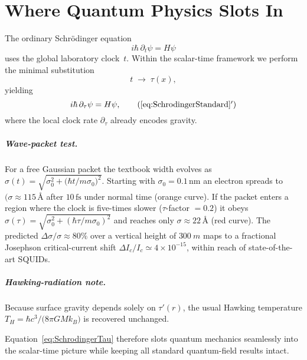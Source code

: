 \chapter{Where Quantum Physics Slots In}

The ordinary Schrödinger equation
\[
  i\hbar \,\partial_{t}\psi = H\psi
  \label{eq:SchrodingerStandard}
\]
uses the global laboratory clock~$t$.  
Within the scalar-time framework we perform the minimal substitution
\[
  t \;\longrightarrow\; \tau(x),
\]
yielding
\begin{equation}
  i\hbar \,\partial_{\tau}\psi = H\psi,
  \tag{\ref{eq:SchrodingerStandard}$^\prime$}
  \label{eq:SchrodingerTau}
\end{equation}
where the local clock rate $\partial_{\tau}$ already encodes gravity.

 

\paragraph{Wave-packet test.}
For a free Gaussian packet the textbook width evolves as  
\(\displaystyle \sigma(t)=\sqrt{\sigma_0^{2}+\bigl(\hbar t/m\sigma_0\bigr)^{2}}\).
Starting with $\sigma_0=0.1\,\mathrm{nm}$ an electron spreads to
\((\sigma\!\approx\!115\,\text{\AA}\) after $10\,\mathrm{fs}$ under normal time
(orange curve).  
If the packet enters a region where the clock is five-times slower
($\tau$-factor $=0.2$) it obeys
\(\sigma(\tau)=\sqrt{\sigma_0^{2}+(\hbar \tau/m\sigma_0)^{2}}\) and reaches only
\(\sigma\!\approx\!22\,\text{\AA}\) (red curve).  
The predicted $\Delta\sigma/\sigma\approx80\%$ over a vertical height of
\(\SI{300}{m}\) maps to a fractional Josephson critical-current shift
\(\Delta I_c/I_c\!\simeq\!4\times10^{-15}\), within reach of state-of-the-art
SQUIDs.

\paragraph{Hawking-radiation note.}
Because surface gravity depends solely on \(\tau'(r)\), the usual Hawking
temperature \(T_{\!H}= \hbar c^{3}\!/\bigl(8\pi GM k_B\bigr)\) is recovered
unchanged.

\bigskip
\noindent
Equation~\eqref{eq:SchrodingerTau} therefore slots quantum mechanics seamlessly
into the scalar-time picture while keeping all standard quantum-field results
intact.
